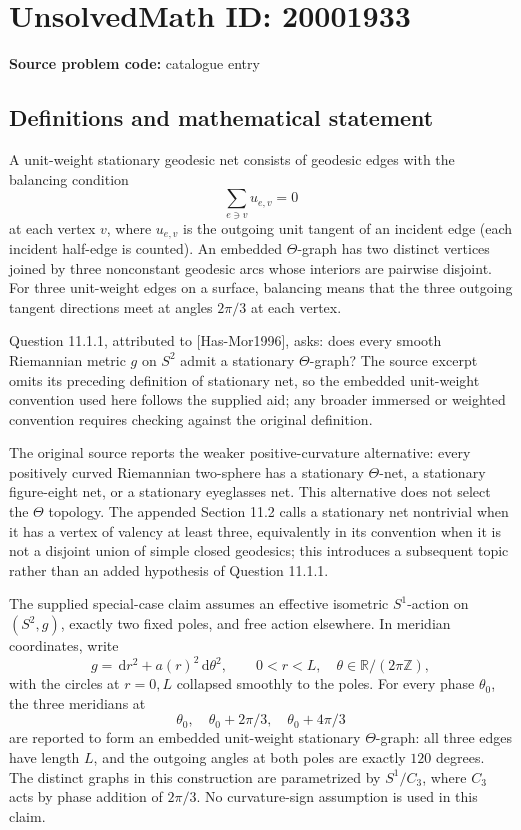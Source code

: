 \documentclass[11pt]{article}
\newcommand{\Z}{\mathbb{Z}}
\newcommand{\R}{\mathbb{R}}
\newcommand{\dd}{\,\mathrm{d}}
\begin{document}
\section*{UnsolvedMath ID: 20001933}
\textbf{Source problem code:} catalogue entry
\subsection{Definitions and mathematical statement}
A unit-weight stationary geodesic net consists of geodesic edges with the balancing condition
\[
 \sum_{e\ni v}u_{e,v}=0
\]
at each vertex \(v\), where \(u_{e,v}\) is the outgoing unit tangent of an incident edge (each incident half-edge is counted). An embedded \(\Theta\)-graph has two distinct vertices joined by three nonconstant geodesic arcs whose interiors are pairwise disjoint. For three unit-weight edges on a surface, balancing means that the three outgoing tangent directions meet at angles \(2\pi/3\) at each vertex.

Question 11.1.1, attributed to [Has-Mor1996], asks: does every smooth Riemannian metric \(g\) on \(S^2\) admit a stationary \(\Theta\)-graph? The source excerpt omits its preceding definition of stationary net, so the embedded unit-weight convention used here follows the supplied aid; any broader immersed or weighted convention requires checking against the original definition.

The original source reports the weaker positive-curvature alternative: every positively curved Riemannian two-sphere has a stationary \(\Theta\)-net, a stationary figure-eight net, or a stationary eyeglasses net. This alternative does not select the \(\Theta\) topology. The appended Section 11.2 calls a stationary net nontrivial when it has a vertex of valency at least three, equivalently in its convention when it is not a disjoint union of simple closed geodesics; this introduces a subsequent topic rather than an added hypothesis of Question 11.1.1.

The supplied special-case claim assumes an effective isometric \(S^1\)-action on \((S^2,g)\), exactly two fixed poles, and free action elsewhere. In meridian coordinates, write
\[
 g=\dd r^2+a(r)^2\dd\theta^2,\qquad 0<r<L,\quad \theta\in\R/(2\pi\Z),
\]
with the circles at \(r=0,L\) collapsed smoothly to the poles. For every phase \(\theta_0\), the three meridians at
\[
 \theta_0,\quad\theta_0+2\pi/3,\quad\theta_0+4\pi/3
\]
are reported to form an embedded unit-weight stationary \(\Theta\)-graph: all three edges have length \(L\), and the outgoing angles at both poles are exactly \(120\) degrees. The distinct graphs in this construction are parametrized by \(S^1/C_3\), where \(C_3\) acts by phase addition of \(2\pi/3\). No curvature-sign assumption is used in this claim.
\end{document}
